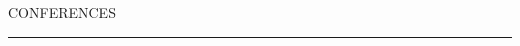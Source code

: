 \documentclass[11pt]{article}
\begin{document}
		
		
		
		
		
		
		
		
		
		
		
		
		
		
		

		
		
			
			
			 
		
	
		
		\noindent CONFERENCES
		
		\vspace{-2mm}
		
		\noindent\rule[0.5ex]{\linewidth}{1pt}
		
\end{document}

